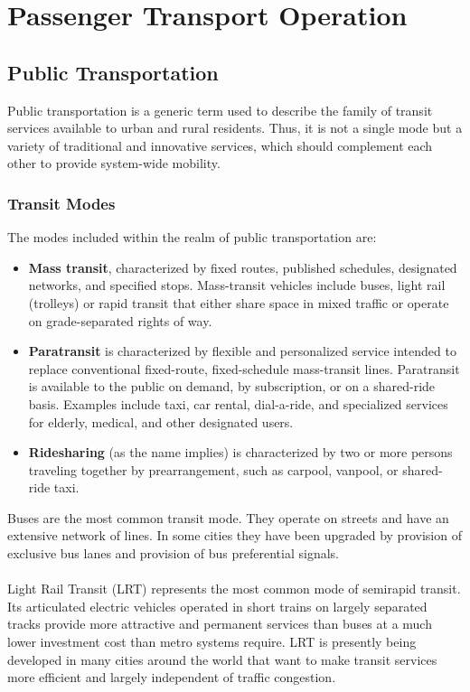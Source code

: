 \chapter{Passenger Transport Operation}
%
\section{Public Transportation}
Public transportation is a generic term used to describe the family of transit services available to urban and rural residents. Thus, it is not a single mode but a variety of traditional and innovative services, which should complement each other to provide system-wide mobility.
%
\subsection{Transit Modes}
The modes included within the realm of public transportation are:
\begin{itemize}
	\item \textbf{Mass transit}, characterized by fixed routes, published schedules, designated networks, and specified stops. Mass-transit vehicles include buses, light rail (trolleys) or rapid transit that either share space in mixed traffic or operate on grade-separated rights of way.
	\item \textbf{Paratransit} is characterized by flexible and personalized service intended to replace conventional fixed-route, fixed-schedule mass-transit lines. Paratransit is available to the public on demand, by subscription, or on a shared-ride basis. Examples include taxi, car rental, dial-a-ride, and specialized services for elderly, medical, and other designated users.
	\item \textbf{Ridesharing} (as the name implies) is characterized by two or more persons traveling together by prearrangement, such as carpool, vanpool, or shared-ride taxi.
\end{itemize}
Buses are the most common transit mode. They operate on streets and have an extensive network of lines. In some cities they have been upgraded by provision of exclusive bus lanes and provision of bus preferential signals.\\\\
Light Rail Transit (LRT) represents the most common mode of semirapid transit. Its articulated electric vehicles operated in short trains on largely separated tracks provide more attractive and permanent services than buses at a much lower investment cost than metro systems require. LRT is presently being developed in many cities around the world that want to make transit services more efficient and largely independent of traffic congestion.\\\\
